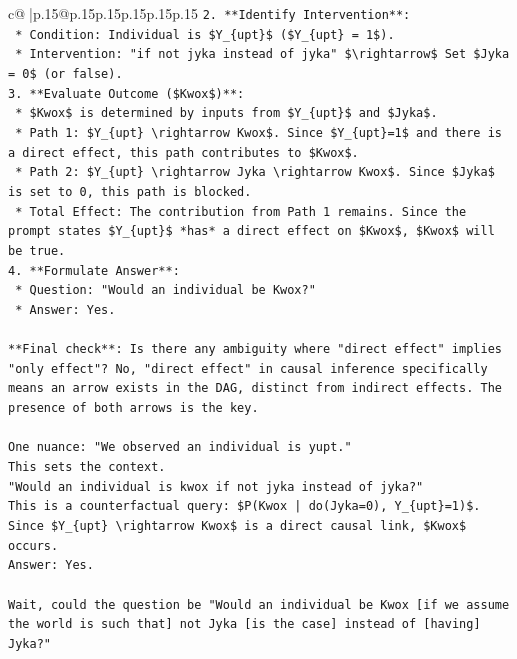 \documentclass{article}
\begin{document}
{\begin{supertabular}{c@{$\;$}|p{.15\linewidth}@{}p{.15\linewidth}p{.15\linewidth}p{.15\linewidth}p{.15\linewidth}p{.15\linewidth}}
{{{\texttt{2.  **Identify Intervention**:} \\
\texttt{    *   Condition: Individual is \$Y\_\{upt\}\$ (\$Y\_\{upt\} = 1\$).} \\
\texttt{    *   Intervention: "if not jyka instead of jyka" \$\textbackslash{}rightarrow\$ Set \$Jyka = 0\$ (or false).} \\
\texttt{3.  **Evaluate Outcome (\$Kwox\$)**:} \\
\texttt{    *   \$Kwox\$ is determined by inputs from \$Y\_\{upt\}\$ and \$Jyka\$.} \\
\texttt{    *   Path 1: \$Y\_\{upt\} \textbackslash{}rightarrow Kwox\$. Since \$Y\_\{upt\}=1\$ and there is a direct effect, this path contributes to \$Kwox\$.} \\
\texttt{    *   Path 2: \$Y\_\{upt\} \textbackslash{}rightarrow Jyka \textbackslash{}rightarrow Kwox\$. Since \$Jyka\$ is set to 0, this path is blocked.} \\
\texttt{    *   Total Effect: The contribution from Path 1 remains. Since the prompt states \$Y\_\{upt\}\$ *has* a direct effect on \$Kwox\$, \$Kwox\$ will be true.} \\
\texttt{4.  **Formulate Answer**:} \\
\texttt{    *   Question: "Would an individual be Kwox?"} \\
\texttt{    *   Answer: Yes.} \\
\\ 
\texttt{**Final check**: Is there any ambiguity where "direct effect" implies "only effect"? No, "direct effect" in causal inference specifically means an arrow exists in the DAG, distinct from indirect effects. The presence of both arrows is the key.} \\
\\ 
\texttt{One nuance: "We observed an individual is yupt."} \\
\texttt{This sets the context.} \\
\texttt{"Would an individual is kwox if not jyka instead of jyka?"} \\
\texttt{This is a counterfactual query: \$P(Kwox | do(Jyka=0), Y\_\{upt\}=1)\$.} \\
\texttt{Since \$Y\_\{upt\} \textbackslash{}rightarrow Kwox\$ is a direct causal link, \$Kwox\$ occurs.} \\
\texttt{Answer: Yes.} \\
\\ 
\texttt{Wait, could the question be "Would an individual be Kwox {[}if we assume the world is such that{]} not Jyka {[}is the case{]} instead of {[}having{]} Jyka?"} \\
}}}
\end{supertabular}}
\end{document}
